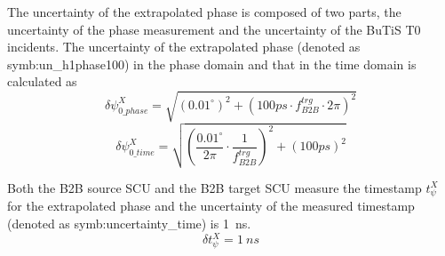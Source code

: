 The uncertainty of the extrapolated phase is composed of two parts, the uncertainty of the phase measurement and the uncertainty of the BuTiS T0 incidents. The uncertainty of the extrapolated phase (denoted as \gls{symb:un_h1phase100}) in the phase domain and that in the time domain is calculated as 
\begin{equation} 
\delta \psi^{X}_\mathit{0\_phase}=\sqrt{(0.01^\circ)^2+(100ps \cdot f_\mathit{B2B}^\mathit{trg} \cdot {2\pi})^2}
\label{jitter_measure_p}
\end{equation}
\begin{equation} 
\delta \psi^{X}_\mathit{0\_time}=\sqrt{(\frac{0.01^\circ}{2\pi}\cdot \frac{1}{f_\mathit{B2B}^\mathit{trg}})^2+(100ps)^2} 
\label{jitter_measure_p}
\end{equation}


Both the B2B source SCU and the B2B target SCU measure the timestamp $t_\psi^X$ for the extrapolated phase and the uncertainty of the measured timestamp (denoted as \gls{symb:uncertainty_time}) is \SI{1}{ns}.  
\begin{equation} 
\delta t_\psi^X= \SI{1}{ns}
\label{jitter_measure_t}
\end{equation}


